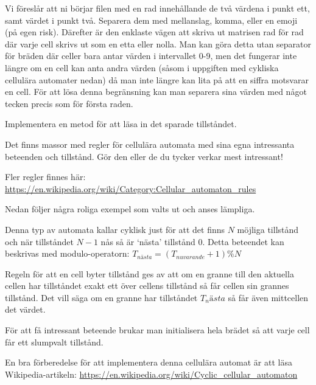        Vi föreslår att ni börjar filen med en rad innehållande de två värdena i punkt ett, samt värdet i punkt två. Separera dem med mellanslag, komma, eller en emoji (på egen risk). Därefter är den enklaste vägen att skriva ut matrisen rad för rad där varje cell skrivs ut som en etta eller nolla. Man kan göra detta utan separator för bräden där celler bara antar värden i intervallet 0-9, men det fungerar inte längre om en cell kan anta andra värden (såsom i uppgiften med cykliska cellulära automater nedan) då man inte längre kan lita på att en siffra motsvarar en cell. För att lösa denna begränsning kan man separera sina värden med något tecken precis som för första raden.
        
        Implementera en metod för att läsa in det sparade tillståndet.


    Det finns massor med regler för cellulära automata med sina egna intressanta beteenden och tillstånd.
    Gör den eller de du tycker verkar mest intressant!

    Fler regler finnes här: \url{https://en.wikipedia.org/wiki/Category:Cellular_automaton_rules}

    Nedan följer några roliga exempel som valts ut och anses lämpliga.


        Denna typ av automata kallar cyklisk just för att det finns $N$ möjliga tillstånd och när tillståndet $N-1$ nås så är `nästa' tillstånd $0$.
        Detta beteendet kan beskrivas med modulo-operatorn: $T_{nästa} = (T_{nuvarande} + 1) \% N$

        Regeln för att en cell byter tillstånd ges av att om en granne till den aktuella cellen har tillståndet exakt ett över cellens tillstånd så får cellen sin grannes tillstånd. Det vill säga om en granne har tillståndet $T_nästa$ så får även mittcellen det värdet.

        För att få intressant beteende brukar man initialisera hela brädet så att varje cell får ett slumpvalt tillstånd.

        En bra förberedelse för att implementera denna cellulära automat är att läsa Wikipedia-artikeln: \url{https://en.wikipedia.org/wiki/Cyclic_cellular_automaton}


